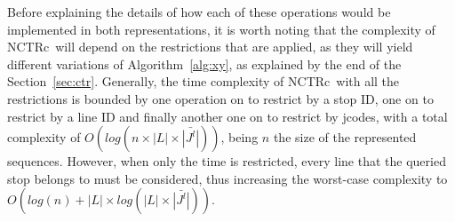 \documentclass[runningheads]{llncs}
\newcommand{\ctrq}{NCTRc}
\begin{document}
\medskip
Before explaining the details of how each of these operations would be implemented in both representations, it is worth noting that the complexity of \ctrq~will depend on the restrictions that are applied, as they will yield different variations of Algorithm~\ref{alg:xy}, as explained by the end of the Section~\ref{sec:ctr}. Generally, the time complexity of \ctrq~with all the restrictions is bounded by one  operation on  to restrict by a stop ID, one on  to restrict by a line ID and finally another one on  to restrict by jcodes, with a total complexity of $O(log(n\times|L|\times\bar{|J^l|}))$, being $n$ the size of the represented sequences. However, when only the time is restricted, every line that the queried stop belongs to must be considered, thus increasing the worst-case complexity to $O(log(n) + |L|\times log(|L|\times\bar{|J^l|}))$.
\end{document}
